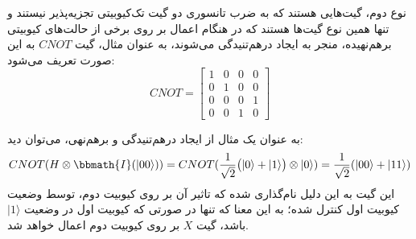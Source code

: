 نوع دوم، گیت‌هایی هستند که به ضرب تانسوری دو گیت تک‌کیوبیتی تجزیه‌پذیر نیستند و تنها همین نوع گیت‌ها هستند که در هنگام اعمال بر روی برخی از حالت‌های کیوبیتی برهم‌نهیده، منجر به ایجاد درهم‌تنیدگی می‌شوند، به عنوان مثال، گیت
$CNOT$
به این صورت تعریف می‌شود:
\begin{equation}
    CNOT = \begin{bmatrix}
    1 & 0 & 0 & 0 \\[3pt]
    0 & 1 & 0 & 0 \\[3pt]
    0 & 0 & 0 & 1 \\[3pt]
    0 & 0 & 1 & 0 
    \end{bmatrix}
\end{equation}

به عنوان یک مثال از ایجاد درهم‌تنیدگی و برهم‌نهی، می‌توان دید:
\begin{equation}
    CNOT(H \otimes \bbmath{I}(|00\rangle)) = CNOT(\frac{1}{\sqrt{2}} \big( |0\rangle + |1\rangle \big) \otimes |0\rangle ) = \frac{1}{\sqrt{2}} (|00\rangle + |11\rangle)
\end{equation}
این گیت به این دلیل نام‌گذاری شده که تاثیر آن بر روی کیوبیت دوم، توسط وضعیت کیوبیت اول کنترل شده؛ به این معنا که تنها در صورتی که کیوبیت اول در وضعیت
$|1\rangle$
باشد، گیت 
$X$
بر روی کیوبیت دوم اعمال خواهد شد.

